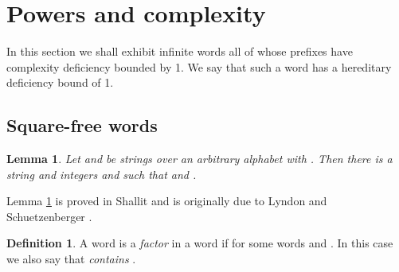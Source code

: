 \documentclass[12pt]{article}
\newcommand{\Squarefree}{Square-free}
\theoremstyle{plain}
\newtheorem{lem}[thm]{Lemma}
\theoremstyle{definition}
\newtheorem{df}[thm]{Definition}
\theoremstyle{remark}
\begin{document}
	\section{Powers and complexity}
		In this section we shall exhibit infinite words all of whose prefixes have complexity deficiency bounded by 1.
		We say that such a word has a hereditary deficiency bound of 1.
		\subsection{{\Squarefree} words}
			\begin{lem}\label{lyndon:schuetzenberger}
				Let  and  be strings over an arbitrary alphabet with .
				Then there is a string  and integers  and  such that  and .
			\end{lem}
			Lemma \ref{lyndon:schuetzenberger} is proved in Shallit \cite[Theorem 2.3.3]{Shallit:2008:SCF:1434864}
			and is originally due to Lyndon and Schuetzenberger \cite{MR0162838}.
			\begin{df}\label{factor}
				A word  is a \emph{factor} in a word  if  for some words  and .
				In this case we also say that  \emph{contains} .
			\end{df}
\end{document}
